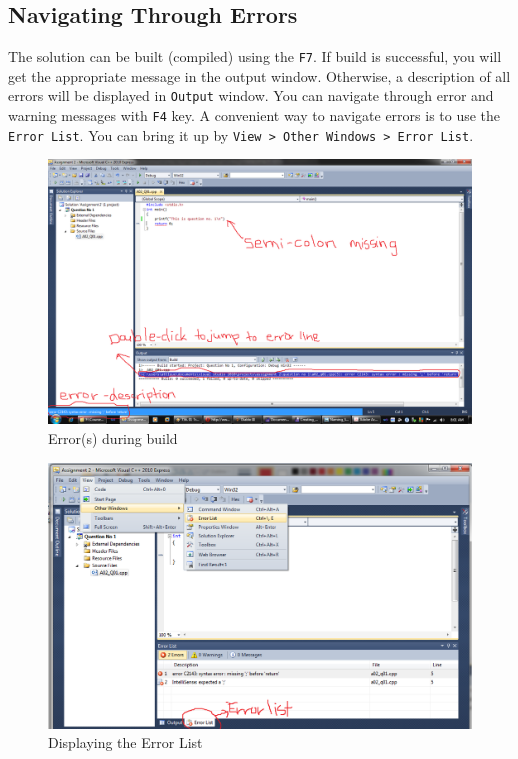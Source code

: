 \documentclass{article}
\begin{document}
\subsection{Navigating Through Errors}
The solution can be built (compiled) using the \verb|F7|. If build is successful, you will get the appropriate message in the output window. Otherwise, a description of all errors will be displayed in \verb|Output| window. You can navigate through error and warning messages with \verb|F4| key. A convenient way to navigate errors is to use the \verb|Error List|. You can bring it up by \verb|View > Other Windows > Error List|.
\begin{figure}[H]
\centering
\includegraphics[width=\textwidth]{Compilation_Error.png}
\caption{Error(s) during build}
\end{figure}
\begin{figure}[H]
\centering
\includegraphics[scale=0.4]{Error_List.png}
\caption{Displaying the Error List}
\end{figure}
\end{document}
